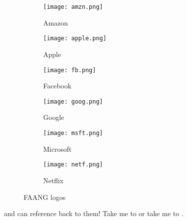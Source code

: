 \documentclass[]{plaid-homework}
\begin{document}
\begin{figure}[h]
  \begin{subfigure}[t]{0.33\textwidth}
    \centering
    \texttt{[image: amzn.png]}
    \caption{Amazon}
    \label{fig:Amazon}
  \end{subfigure}
  \begin{subfigure}[t]{0.33\textwidth}
    \centering
    \texttt{[image: apple.png]}
    \caption{Apple}
    \label{fig:Apple}
  \end{subfigure}
  \begin{subfigure}[t]{0.33\textwidth}
    \centering
    \texttt{[image: fb.png]}
    \caption{Facebook}
    \label{fig:Facebook}
  \end{subfigure}
  \begin{subfigure}[t]{0.33\textwidth}
    \centering
    \texttt{[image: goog.png]}
    \caption{Google}
    \label{fig:Google}
  \end{subfigure}
  \begin{subfigure}[t]{0.33\textwidth}
    \centering
    \texttt{[image: msft.png]}
    \caption{Microsoft}
    \label{fig:Microsoft}
  \end{subfigure}
  \begin{subfigure}[t]{0.33\textwidth}
    \centering
    \texttt{[image: netf.png]}
    \caption{Netflix}
    \label{fig:Netflix}
  \end{subfigure}
  \caption{FAANG logos}
  \label{fig:FAANG}
\end{figure}

\vspace{7em}

and can reference back to them! Take me to  or take me to  .
\end{document}
